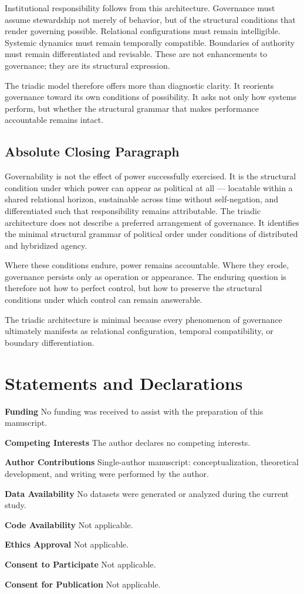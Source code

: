 \documentclass[12pt]{article}
\begin{document}
Institutional responsibility follows from this architecture. Governance must assume stewardship not merely of behavior, but of the structural conditions that render governing possible. Relational configurations must remain intelligible. Systemic dynamics must remain temporally compatible. Boundaries of authority must remain differentiated and revisable. These are not enhancements to governance; they are its structural expression.

The triadic model therefore offers more than diagnostic clarity. It reorients governance toward its own conditions of possibility. It asks not only how systems perform, but whether the structural grammar that makes performance accountable remains intact.

\subsection{Absolute Closing Paragraph}
Governability is not the effect of power successfully exercised. It is the structural condition under which power can appear as political at all — locatable within a shared relational horizon, sustainable across time without self-negation, and differentiated such that responsibility remains attributable. The triadic architecture does not describe a preferred arrangement of governance. It identifies the minimal structural grammar of political order under conditions of distributed and hybridized agency.

Where these conditions endure, power remains accountable. Where they erode, governance persists only as operation or appearance. The enduring question is therefore not how to perfect control, but how to preserve the structural conditions under which control can remain answerable.

The triadic architecture is minimal because every phenomenon of governance ultimately manifests as relational configuration, temporal compatibility, or boundary differentiation.





\section*{Statements and Declarations}

\noindent\textbf{Funding} No funding was received to assist with the preparation of this manuscript.

\noindent\textbf{Competing Interests} The author declares no competing interests.

\noindent\textbf{Author Contributions} Single-author manuscript: conceptualization, theoretical development, and writing were performed by the author.

\noindent\textbf{Data Availability} No datasets were generated or analyzed during the current study.

\noindent\textbf{Code Availability} Not applicable.

\noindent\textbf{Ethics Approval} Not applicable.

\noindent\textbf{Consent to Participate} Not applicable.

\noindent\textbf{Consent for Publication} Not applicable.
\end{document}
